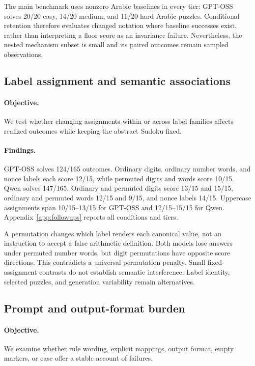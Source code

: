 \documentclass[11pt]{article}
\begin{document}
The main benchmark uses nonzero Arabic baselines in every tier: GPT-OSS solves 20/20 easy, 14/20 medium, and 11/20 hard Arabic puzzles. Conditional retention therefore evaluates changed notation where baseline successes exist, rather than interpreting a floor score as an invariance failure. Nevertheless, the nested mechanism subset is small and its paired outcomes remain sampled observations.

\subsection{Label assignment and semantic associations}
\paragraph{Objective.} We test whether changing assignments within or across label families affects realized outcomes while keeping the abstract Sudoku fixed.
\paragraph{Findings.} GPT-OSS solves 124/165 outcomes. Ordinary digits, ordinary number words, and nonce labels each score 12/15, while permuted digits and words score 10/15. Qwen solves 147/165. Ordinary and permuted digits score 13/15 and 15/15, ordinary and permuted words 12/15 and 9/15, and nonce labels 14/15. Uppercase assignments span 10/15--13/15 for GPT-OSS and 12/15--15/15 for Qwen. Appendix~\ref{app:followups} reports all conditions and tiers.

A permutation changes which label renders each canonical value, not an instruction to accept a false arithmetic definition. Both models lose answers under permuted number words, but digit permutations have opposite score directions. This contradicts a universal permutation penalty. Small fixed-assignment contrasts do not establish semantic interference. Label identity, selected puzzles, and generation variability remain alternatives.

\subsection{Prompt and output-format burden}
\paragraph{Objective.} We examine whether rule wording, explicit mappings, output format, empty markers, or case offer a stable account of failures.
\end{document}
